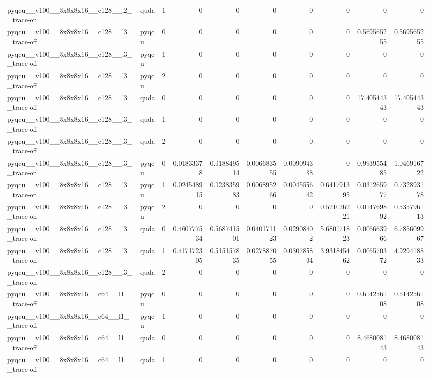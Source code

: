 \begin{table}[htbp]
\begin{tabular}{@{}llrrrrrrrr@{}}
pyqcu\_\_v100\_\_8x8x8x16\_\_c128\_\_l2\_\_trace-on & quda & 1 & 0 & 0 & 0 & 0 & 0 & 0 & 0 \\
pyqcu\_\_v100\_\_8x8x8x16\_\_c128\_\_l3\_\_trace-off & pyqcu & 0 & 0 & 0 & 0 & 0 & 0 & 0.569565255 & 0.569565255 \\
pyqcu\_\_v100\_\_8x8x8x16\_\_c128\_\_l3\_\_trace-off & pyqcu & 1 & 0 & 0 & 0 & 0 & 0 & 0 & 0 \\
pyqcu\_\_v100\_\_8x8x8x16\_\_c128\_\_l3\_\_trace-off & pyqcu & 2 & 0 & 0 & 0 & 0 & 0 & 0 & 0 \\
pyqcu\_\_v100\_\_8x8x8x16\_\_c128\_\_l3\_\_trace-off & quda & 0 & 0 & 0 & 0 & 0 & 0 & 17.40544343 & 17.40544343 \\
pyqcu\_\_v100\_\_8x8x8x16\_\_c128\_\_l3\_\_trace-off & quda & 1 & 0 & 0 & 0 & 0 & 0 & 0 & 0 \\
pyqcu\_\_v100\_\_8x8x8x16\_\_c128\_\_l3\_\_trace-off & quda & 2 & 0 & 0 & 0 & 0 & 0 & 0 & 0 \\
pyqcu\_\_v100\_\_8x8x8x16\_\_c128\_\_l3\_\_trace-on & pyqcu & 0 & 0.01833378 & 0.018849514 & 0.006683555 & 0.009094388 & 0 & 0.993955485 & 1.046916722 \\
pyqcu\_\_v100\_\_8x8x8x16\_\_c128\_\_l3\_\_trace-on & pyqcu & 1 & 0.024548915 & 0.023835983 & 0.006895266 & 0.004555642 & 0.641791395 & 0.031265977 & 0.732893178 \\
pyqcu\_\_v100\_\_8x8x8x16\_\_c128\_\_l3\_\_trace-on & pyqcu & 2 & 0 & 0 & 0 & 0 & 0.521026221 & 0.014769892 & 0.535796113 \\
pyqcu\_\_v100\_\_8x8x8x16\_\_c128\_\_l3\_\_trace-on & quda & 0 & 0.460777534 & 0.568741501 & 0.040171123 & 0.02908402 & 5.680171823 & 0.006663966 & 6.785609967 \\
pyqcu\_\_v100\_\_8x8x8x16\_\_c128\_\_l3\_\_trace-on & quda & 1 & 0.417172305 & 0.515157835 & 0.027887055 & 0.030785804 & 3.931845462 & 0.006570372 & 4.929418833 \\
pyqcu\_\_v100\_\_8x8x8x16\_\_c128\_\_l3\_\_trace-on & quda & 2 & 0 & 0 & 0 & 0 & 0 & 0 & 0 \\
pyqcu\_\_v100\_\_8x8x8x16\_\_c64\_\_l1\_\_trace-off & pyqcu & 0 & 0 & 0 & 0 & 0 & 0 & 0.614256108 & 0.614256108 \\
pyqcu\_\_v100\_\_8x8x8x16\_\_c64\_\_l1\_\_trace-off & pyqcu & 1 & 0 & 0 & 0 & 0 & 0 & 0 & 0 \\
pyqcu\_\_v100\_\_8x8x8x16\_\_c64\_\_l1\_\_trace-off & quda & 0 & 0 & 0 & 0 & 0 & 0 & 8.468008143 & 8.468008143 \\
pyqcu\_\_v100\_\_8x8x8x16\_\_c64\_\_l1\_\_trace-off & quda & 1 & 0 & 0 & 0 & 0 & 0 & 0 & 0 \\

\end{tabular}
\end{table}
